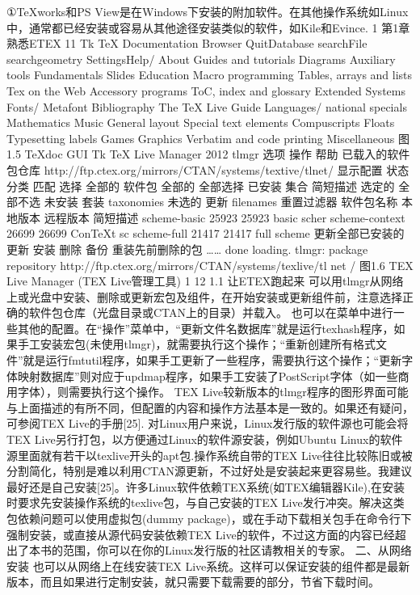 \documentclass[UTF8]{ctexart}
\begin{document}
①TeXworks和PS View是在Windows下安装的附加软件。在其他操作系统如Linux中，通常都已经安装或容易从其他途径安装类似的软件，如Kile和Evince.
1
第1章	熟悉ETEX	11
Tk TeX Documentation Browser
QuitDatabase searchFile searchgeometry	SettingsHelp/ About
Guides and tutorials	Diagrams	Auxiliary tools
Fundamentals	Slides	Education
Macro programming	Tables, arrays and lists	Tex on the Web
Accessory programs	ToC, index and glossary	Extended Systems
Fonts/ Metafont	Bibliography	The TeX Live Guide
Languages/ national specials	Mathematics	Music
General layout	Special text elements	Compuscripts
Floats	Typesetting labels	Games
Graphics	Verbatim and code printing	Miscellaneous
图1.5 TeXdoc GUI
Tk TeX Live Manager 2012
tlmgr
选项
操作
帮助
已载入的软件包仓库
http://ftp.ctex.org/mirrors/CTAN/systems/textive/tlnet/
显示配置
状态
分类
匹配
选择
全部的
软件包
全部的
全部选择
已安装
集合
简短描述
选定的
全部不选
未安装
套装
taxonomies
未选的
更新
filenames
重置过滤器
软件包名称
本地版本
远程版本
简短描述
scheme-basic
25923
25923
basic scher
scheme-context
26699
26699
ConTeXt sc
scheme-full
21417
21417
full scheme
更新全部已安装的
更新
安装
删除
备份
重装先前删除的包
…… done loading.
tlmgr: package repository
http://ftp.ctex.org/mirrors/CTAN/systems/texlive/tl
net
/
图1.6 TEX Live Manager (TEX Live管理工具)
1
12	1.1 让ETEX跑起来
可以用tlmgr从网络上或光盘中安装、删除或更新宏包及组件，在开始安装或更新组件前，注意选择正确的软件包仓库（光盘目录或CTAN上的目录）并载入。
也可以在菜单中进行一些其他的配置。在“操作”菜单中，“更新文件名数据库”就是运行texhash程序，如果手工安装宏包(未使用tlmgr)，就需要执行这个操作；“重新创建所有格式文件”就是运行fmtutil程序，如果手工更新了一些程序，需要执行这个操作；“更新字体映射数据库”则对应于updmap程序，如果手工安装了PostScript字体（如一些商用字体），则需要执行这个操作。
TEX Live较新版本的tlmgr程序的图形界面可能与上面描述的有所不同，但配置的内容和操作方法基本是一致的。如果还有疑问，可参阅TEX Live的手册[25].
对Linux用户来说，Linux发行版的软件源也可能会将TEX Live另行打包，以方便通过Linux的软件源安装，例如Ubuntu Linux的软件源里面就有若干以texlive开头的apt包.操作系统自带的TEX Live往往比较陈旧或被分割简化，特别是难以利用CTAN源更新，不过好处是安装起来更容易些。我建议最好还是自己安装[25]。许多Linux软件依赖TEX系统(如TEX编辑器Kile),在安装时要求先安装操作系统的texlive包，与自己安装的TEX Live发行冲突。解决这类包依赖问题可以使用虚拟包(dummy package)，或在手动下载相关包手在命令行下强制安装，或直接从源代码安装依赖TEX Live的软件，不过这方面的内容已经超出了本书的范围，你可以在你的Linux发行版的社区请教相关的专家。
二、从网络安装
也可以从网络上在线安装TEX Live系统。这样可以保证安装的组件都是最新版本，而且如果进行定制安装，就只需要下载需要的部分，节省下载时间。
\end{document}
